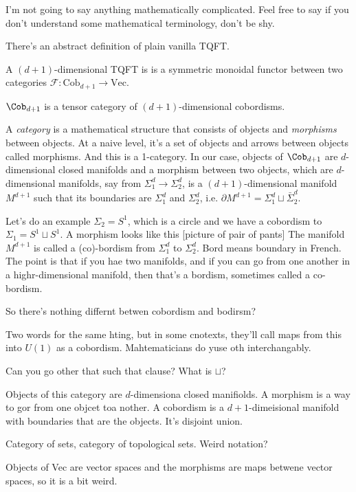 I'm not going to say anything mathematically complicated.
Feel free to say if you don't understand some mathematical terminology,
don't be shy.

There's an abstract definition of plain vanilla TQFT.
\begin{definition}
    A $(d+1)$-dimensional TQFT is is a symmetric monoidal functor
    between two categories $\mathcal{F}: \mathrm{Cob}_{d + 1}\to \mathrm{Vec}$.
\end{definition}

$\Cob_{d + 1}$ is a tensor category of $(d + 1)$-dimensional cobordisms.

A \emph{category} is a mathematical structure that consists of objects
and \emph{morphisms} between objects.
At a naive level,
it's a set of objects and arrows between objects called morphisms.
And this is a 1-category.
In our case,
objects of $\Cob_{d + 1}$ are $d$-dimensional closed manifolds
and a morphism between two objects,
which are $d$-dimensional manifolds,
say from $\Sigma_1^d\to\Sigma_2^d$,
is a $(d+1)$-dimensional manifold $M^{d+1}$
such that its boundaries are $\Sigma_1^d$ and $\Sigma_2^d$,
i.e.
$\partial M^{d + 1} = \Sigma_1^d\sqcup \bar{\Sigma}_2^d$.

Let's do an example $\Sigma_2 = S^1$, which is a circle
and we have a cobordism to $\Sigma_1 = S^1\sqcup S^1$.
A morphism looks like this
[picture of pair of pants]
The manifold $M^{d+1}$ is called a (co)-bordism
from $\Sigma_1^d$ to $\Sigma_2^d$.
Bord means boundary in French.
The point is that if you hae two manifolds,
and if you can go from one another in a highr-dimensional manifold,
then that's a bordism, sometimes called a co-bordism.

\begin{question}
    So there's nothing differnt betwen cobordism and bodirsm?
\end{question}
Two words for the same hting,
but in some cnotexts,
they'll call maps from this into $U(1)$ as a cobordism.
Mahtematicians do yuse oth interchangably.

\begin{question}
    Can you go other that such that clause?
    What is $\sqcup$?
\end{question}
Objects of this category are $d$-dimensiona closed manifiolds.
A morphism is a way to gor from one objcet toa nother.
A cobordism is a $d+1$-dimeisional manifold with boundaries that are the
objects.
It's disjoint union.

\begin{question}
    Category of sets, category of topological sets.
    Weird notation?
\end{question}
Objects of Vec are vector spaces and the morphisms are maps betwene vector
spaces, so it is a bit weird.

